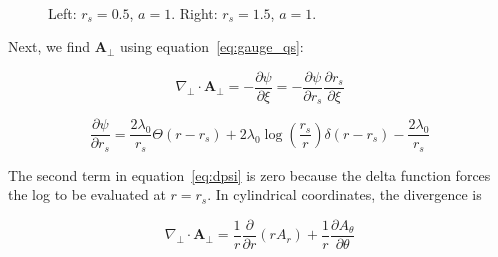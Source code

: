 \documentclass[aps,prl,preprint,groupedaddress]{revtex4-1}
\begin{document}
\begin{figure}
\centering
\mbox{\quad
{}}
\caption{Left: $r_s = 0.5$, $a=1$. Right: $r_s = 1.5$, $a=1$.} \label{fig12}
\end{figure}

Next, we find $\mathbf{A}_{\perp}$ using equation~\ref{eq:gauge_qs}:

\begin{equation}\label{eq:a_perp}
\nabla_\perp \cdot \mathbf{A}_\perp = -\frac{\partial \psi}{\partial \xi} = - \frac{\partial \psi}{\partial r_s}\frac{\partial r_s}{\partial \xi}
\end{equation}

\begin{equation}\label{eq:dpsi}
\frac{\partial \psi}{\partial r_s} = \frac{2\lambda_0}{r_s}\Theta(r-r_s) + 2\lambda_0 \log\left(\frac{r_s}{r}\right)\delta(r-r_s) - \frac{2\lambda_0}{r_s} 
\end{equation}

The second term in equation~\ref{eq:dpsi} is zero because the delta function forces the log to be evaluated at $r=r_s$. In cylindrical coordinates, the divergence is

\begin{equation}\label{eq:a_perp_cyl}
\nabla_\perp \cdot \mathbf{A}_\perp = \frac{1}{r}\frac{\partial}{\partial r} (r A_r) + \frac{1}{r}\frac{\partial A_{\theta}}{\partial \theta}
\end{equation}
\end{document}
